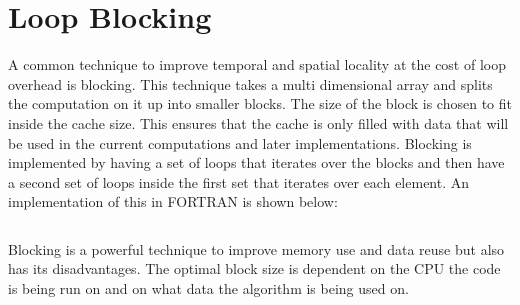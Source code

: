 \section{Loop Blocking}
A common technique to improve temporal and spatial locality at the cost of loop overhead is blocking. This technique takes a multi dimensional array and splits the computation on it up into smaller blocks. The size of the block is chosen to fit inside the cache size. This ensures that the cache is only filled with data that will be used in the current computations and later implementations. Blocking is implemented by having a set of loops that iterates over the blocks and then have a second set of loops inside the first set that iterates over each element. An implementation of this in FORTRAN is shown below:
\begin{lstlisting}

\end{lstlisting}
Blocking is a powerful technique to improve memory use and data reuse but also has its disadvantages. The optimal block size is dependent on the CPU the code is being run on and on what data the algorithm is being used on. 